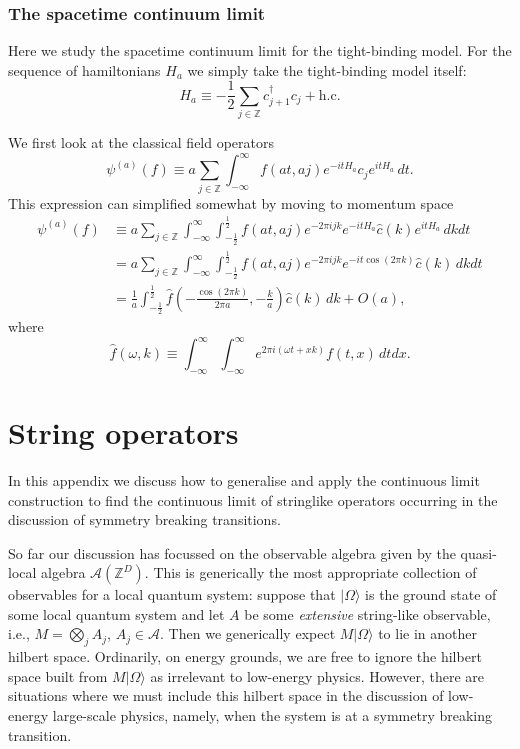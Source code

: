 \documentclass[prl,twocolumn,lengthcheck,superscriptaddress]{revtex4-1}
\theoremstyle{definition}
\theoremstyle{remark}
\begin{document}
\subsubsection{The spacetime continuum limit}
Here we study the spacetime continuum limit for the tight-binding model. For the sequence of hamiltonians $H_a$ we simply take the tight-binding model itself:
\begin{equation}
	H_a \equiv -\frac12 \sum_{j\in\mathbb{Z}} c_{j+1}^\dag c_j + \text{h.c.}
\end{equation}

We first look at the classical field operators 
\begin{equation}
	\psi^{(a)}(f) \equiv a\sum_{j\in\mathbb{Z}} \int_{-\infty}^\infty f(at, aj) e^{-itH_a}c_j e^{itH_a} \, dt.
\end{equation}
This expression can simplified somewhat by moving to momentum space
\begin{equation}
	\begin{split}
		\psi^{(a)}(f) &\equiv a\sum_{j\in\mathbb{Z}} \int_{-\infty}^\infty \int_{-\frac12}^{\frac12} f(at, aj) e^{-2\pi i jk} e^{-itH_a}\widehat{c}(k) e^{itH_a} \, dkdt \\
		&= a\sum_{j\in\mathbb{Z}} \int_{-\infty}^\infty \int_{-\frac12}^{\frac12} f(at, aj) e^{-2\pi i jk} e^{-it \cos(2\pi k)} \widehat{c}(k)  \, dkdt \\
		&= \frac{1}{a}\int_{-\frac12}^{\frac12}\widehat{f}\left(-\frac{\cos(2\pi k)}{2\pi a}, -\frac{k}{a}\right) \widehat{c}(k)\, dk + O(a),
	\end{split}
\end{equation}
where
\begin{equation}
	\widehat{f}(\omega,k) \equiv \int_{-\infty}^{\infty} \int_{-\infty}^{\infty} e^{2\pi i (\omega t + xk)}f(t,x)\, dtdx.
\end{equation}

\section{String operators}
In this appendix we discuss how to generalise and apply the continuous limit construction to find the continuous limit of stringlike operators occurring in the discussion of symmetry breaking transitions. 

So far our discussion has focussed on the observable algebra given by the quasi-local algebra $\mathcal{A}(\mathbb{Z}^D)$. This is generically the most appropriate collection of observables for a local quantum system: suppose that $|\Omega\rangle$ is the ground state of some local quantum system and let $A$ be some \emph{extensive} string-like observable, i.e., $M = \bigotimes_{j} A_j$, $A_j\in \mathcal{A}$. Then we generically expect $M|\Omega\rangle$ to lie in another hilbert space. Ordinarily, on energy grounds, we are free to ignore the hilbert space built from $M|\Omega\rangle$ as irrelevant to low-energy physics. However, there are situations where we must include this hilbert space in the discussion of low-energy large-scale physics, namely, when the system is at a symmetry breaking transition. 
\end{document}
